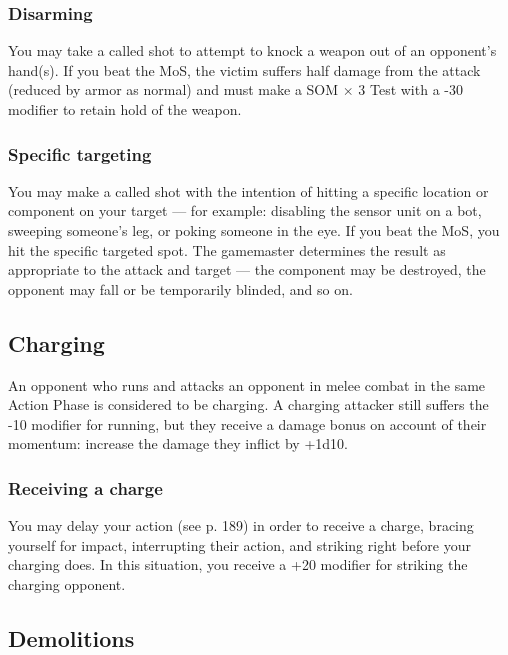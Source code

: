 \subsubsection{Disarming}

You may take a called shot to attempt to knock a weapon out of an opponent’s hand(s). If you beat the MoS, the victim suffers half damage from the attack (reduced by armor as normal) and must make a SOM $\times$ 3 Test with a -30 modifier to retain hold of the weapon.

\subsubsection{Specific targeting}

You may make a called shot with the intention of hitting a specific location or component on your target --- for example: disabling the sensor unit on a bot, sweeping someone’s leg, or poking someone in the eye. If you beat the MoS, you hit the specific targeted spot. The gamemaster determines the result as appropriate to the attack and target --- the component may be destroyed, the opponent may fall or be temporarily blinded, and so on.

\subsection{Charging}
\label{sec:charging}

An opponent who runs and attacks an opponent in melee combat in the same Action Phase is considered to be charging. A charging attacker still suffers the -10 modifier for running, but they receive a damage bonus on account of their momentum: increase the damage they inflict by +1d10.

\subsubsection{Receiving a charge}

You may delay your action (see p. 189) in order to receive a charge, bracing yourself for impact, interrupting their action, and striking right before your charging does. In this situation, you receive a +20 modifier for striking the charging opponent.


\subsection{Demolitions}
\label{sec:demolitions}

